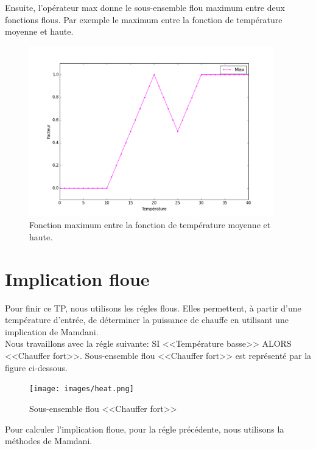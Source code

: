 \documentclass[a4paper,11pt]{article}
\begin{document}
Ensuite, l'opérateur max donne le sous-ensemble flou maximum 
entre deux fonctions flous. Par exemple le maximum entre la 
fonction de température moyenne et haute.

\begin{figure}[H]
  \begin{center}
  \includegraphics[height=280px]{images/max.png}
  \caption{Fonction maximum entre la fonction de température moyenne et haute.}
  \end{center}
\end{figure}

\newpage

\section{Implication floue}

Pour finir ce TP, nous utilisons les régles flous. Elles 
permettent, à partir d'une température d'entrée, de déterminer 
la puissance de chauffe en utilisant une implication de Mamdani.\\

Nous travaillons avec la régle suivante: SI <<Température basse>> 
ALORS <<Chauffer fort>>. Sous-ensemble flou <<Chauffer fort>> est 
représenté par la figure ci-dessous.

\begin{figure}[H]
  \begin{center}
  \texttt{[image: images/heat.png]}
  \caption{Sous-ensemble flou <<Chauffer fort>>}
  \end{center}
\end{figure}

Pour calculer l'implication floue, pour la régle précédente, 
nous utilisons la méthodes de Mamdani.\\
\end{document}
